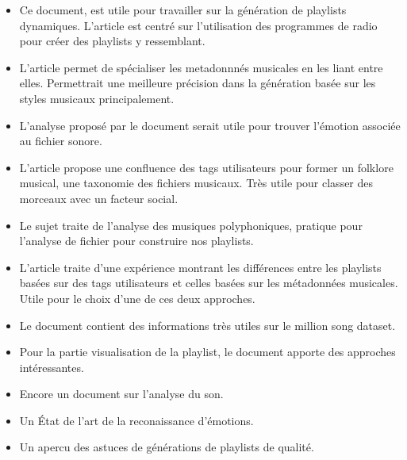 \documentclass{article}
\begin{document}
\begin{itemize}

\item Ce document\cite{ref1}, est utile pour travailler sur la génération de
playlists dynamiques. L'article est centré sur l'utilisation des programmes de
radio pour créer des playlists y ressemblant.
\item L'article\cite{ref2} permet de spécialiser les metadonnnés musicales en
les liant entre elles. Permettrait une meilleure précision dans la génération
basée sur les styles musicaux principalement.
\item L'analyse proposé par le document\cite{ref3} serait utile pour trouver
l'émotion associée au fichier sonore.
\item L'article\cite{ref4} propose une confluence des tags utilisateurs pour
former un folklore musical, une taxonomie des fichiers musicaux. Très utile pour
classer des morceaux avec un facteur social.
\item Le sujet\cite{ref5} traite de l'analyse des musiques polyphoniques,
pratique pour l'analyse de fichier pour construire nos playlists.
\item L'article\cite{ref6} traite d'une expérience montrant les différences
entre les playlists basées sur des tags utilisateurs et celles basées sur les
métadonnées musicales. Utile pour le choix d'une de ces deux approches.
\item Le document\cite{ref7} contient des informations très utiles sur le million
song dataset.
\item Pour la partie visualisation de la playlist, le document\cite{ref8}
apporte des approches intéressantes.
\item Encore un document\cite{ref9} sur l'analyse du son.
\item Un État de l'art de la reconaissance d'émotions\cite{ref10}.
\item Un apercu des astuces de générations de playlists de qualité\cite{ref11}.

\end{itemize}



\end{document}
